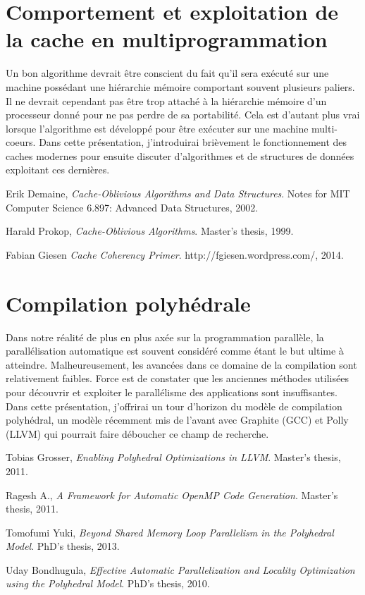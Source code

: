 \documentclass{article}
\begin{document}
\section*{Comportement et exploitation de la cache en multiprogrammation}
Un bon algorithme devrait être conscient du fait qu'il sera exécuté sur une machine possédant une hiérarchie mémoire comportant souvent plusieurs paliers. Il ne devrait cependant pas être trop attaché à la hiérarchie mémoire d'un processeur donné pour ne pas perdre de sa portabilité. Cela est d'autant plus vrai lorsque l'algorithme est développé pour être exécuter sur une machine multi-coeurs. Dans cette présentation, j'introduirai brièvement le fonctionnement des caches modernes pour ensuite discuter d'algorithmes et de structures de données exploitant ces dernières.
\renewcommand\refname{Références Cache}
\begin{thebibliography}{9}
          Erik Demaine,
          \emph{Cache-Oblivious Algorithms and Data Structures}.
          Notes for MIT Computer Science 6.897: Advanced Data Structures, 2002.
          
          Harald Prokop,
          \emph{Cache-Oblivious Algorithms}.
          Master's thesis, 1999.
          
          Fabian Giesen
          \emph{Cache Coherency Primer}.
          http://fgiesen.wordpress.com/, 2014.
         
\end{thebibliography}

\newpage

\section*{Compilation polyhédrale}
Dans notre réalité de plus en plus axée sur la programmation parallèle, la parallélisation automatique est souvent considéré comme étant le but ultime à atteindre. Malheureusement, les avancées dans ce domaine de la compilation sont relativement faibles. Force est de constater que les anciennes méthodes utilisées pour découvrir et exploiter le parallélisme des applications sont insuffisantes. Dans cette présentation, j'offrirai un tour d'horizon du modèle de compilation polyhédral, un modèle récemment mis de l'avant avec Graphite (GCC) et Polly (LLVM) qui pourrait faire déboucher ce champ de recherche.
\renewcommand\refname{Références Poly}
\begin{thebibliography}{9}
          Tobias Grosser,
          \emph{Enabling Polyhedral Optimizations in LLVM}.
          Master's thesis, 2011.

          Ragesh A.,
          \emph{A Framework for Automatic OpenMP Code Generation}.
          Master's thesis, 2011.
          
          Tomofumi Yuki,
          \emph{Beyond Shared Memory Loop Parallelism in the Polyhedral Model}.
          PhD's thesis, 2013.
          
          Uday Bondhugula,
          \emph{Effective Automatic Parallelization and Locality Optimization using the Polyhedral Model}.
          PhD's thesis, 2010.                
\end{thebibliography}
\end{document}
